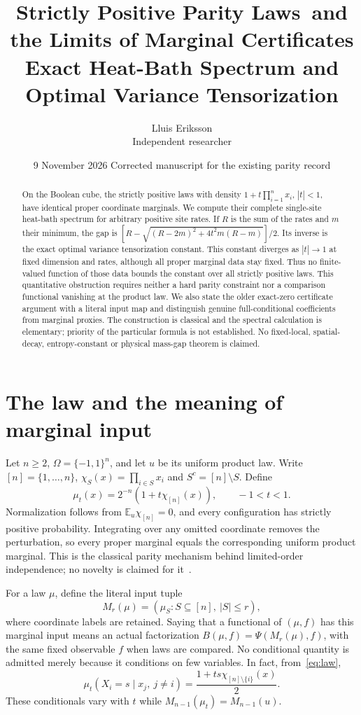 \documentclass[11pt]{article}
\title{Strictly Positive Parity Laws\ and the Limits of Marginal Certificates\\[3pt]
\large Exact Heat-Bath Spectrum and Optimal Variance Tensorization}
\author{Lluis Eriksson\\\small Independent researcher}
\date{9 November 2026 \quad Corrected manuscript for the existing parity record}
\newcommand{\E}{\mathbb E}
\begin{document}
\maketitle
\begin{abstract}
On the Boolean cube, the strictly positive laws with density
$1+t\prod_{i=1}^n x_i$, $|t|<1$, have identical proper coordinate
marginals. We compute their complete single-site heat-bath spectrum
for arbitrary positive site rates. If $R$ is the sum of the rates and
$m$ their minimum, the gap is
$[R-\sqrt{(R-2m)^2+4t^2m(R-m)}]/2$.
Its inverse is the exact optimal variance tensorization constant.
This constant diverges as $|t|\to1$ at fixed dimension and rates,
although all proper marginal data stay fixed. Thus no finite-valued
function of those data bounds the constant over all strictly positive
laws. This quantitative obstruction requires neither a hard parity
constraint nor a comparison functional vanishing at the product law.
We also state the older exact-zero certificate argument with a literal
input map and distinguish genuine full-conditional coefficients from
marginal proxies. The construction is classical and the spectral
calculation is elementary; priority of the particular formula is not
established. No fixed-local, spatial-decay, entropy-constant or physical
mass-gap theorem is claimed.
\end{abstract}

\section{The law and the meaning of marginal input}
Let $n\ge2$, $\Omega=\{-1,1\}^n$, and let $u$ be its uniform product
law. Write $[n]=\{1,\ldots,n\}$,
$\chi_S(x)=\prod_{i\in S}x_i$ and $S^c=[n]\setminus S$. Define
\begin{equation}\label{eq:law}
 \mu_t(x)=2^{-n}(1+t\chi_{[n]}(x)),\qquad -1<t<1.
\end{equation}
Normalization follows from $\E_u\chi_{[n]}=0$, and every configuration
has strictly positive probability. Integrating over any omitted
coordinate removes the perturbation, so every proper marginal equals
the corresponding uniform product marginal. This is the classical
parity mechanism behind limited-order independence; no novelty is
claimed for it~\cite{AGM}.

For a law $\mu$, define the literal input tuple
\[
 M_r(\mu)=(\mu_S:S\subseteq[n],\ |S|\le r),
\]
where coordinate labels are retained. Saying that a functional of
$(\mu,f)$ has this marginal input means an actual factorization
$B(\mu,f)=\Psi(M_r(\mu),f)$, with the same fixed observable $f$ when
laws are compared. No conditional quantity is admitted merely because
it conditions on few variables. In fact, from~\eqref{eq:law},
\begin{equation}\label{eq:conditional}
 \mu_t(X_i=s\mid x_j,\ j\ne i)
 =\frac{1+t s\chi_{[n]\setminus\{i\}}(x)}2.
\end{equation}
These conditionals vary with $t$ while $M_{n-1}(\mu_t)=M_{n-1}(u)$.
\end{document}
